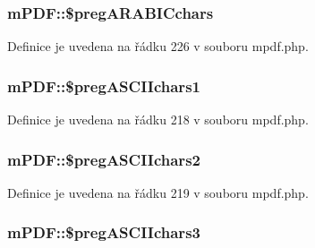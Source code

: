 \hypertarget{classm_p_d_f_a33b7687be7b2c5ed6ce5f3d09b0d6605}{
\subsubsection[{\$preg\-A\-R\-A\-B\-I\-Cchars}]{\setlength{\rightskip}{0pt plus 5cm}m\-P\-D\-F\-::\$preg\-A\-R\-A\-B\-I\-Cchars}}\label{classm_p_d_f_a33b7687be7b2c5ed6ce5f3d09b0d6605}


Definice je uvedena na řádku 226 v souboru mpdf.\-php.

\hypertarget{classm_p_d_f_a505f6fdb4b2f3dd7b58fc97984fcf07e}{
\subsubsection[{\$preg\-A\-S\-C\-I\-Ichars1}]{\setlength{\rightskip}{0pt plus 5cm}m\-P\-D\-F\-::\$preg\-A\-S\-C\-I\-Ichars1}}\label{classm_p_d_f_a505f6fdb4b2f3dd7b58fc97984fcf07e}


Definice je uvedena na řádku 218 v souboru mpdf.\-php.

\hypertarget{classm_p_d_f_ad6433b4ca18a546f1fc8b81b45e59f52}{
\subsubsection[{\$preg\-A\-S\-C\-I\-Ichars2}]{\setlength{\rightskip}{0pt plus 5cm}m\-P\-D\-F\-::\$preg\-A\-S\-C\-I\-Ichars2}}\label{classm_p_d_f_ad6433b4ca18a546f1fc8b81b45e59f52}


Definice je uvedena na řádku 219 v souboru mpdf.\-php.

\hypertarget{classm_p_d_f_a6da10b526a0e13ce3439bac166fce23c}{
\subsubsection[{\$preg\-A\-S\-C\-I\-Ichars3}]{\setlength{\rightskip}{0pt plus 5cm}m\-P\-D\-F\-::\$preg\-A\-S\-C\-I\-Ichars3}}\label{classm_p_d_f_a6da10b526a0e13ce3439bac166fce23c}


